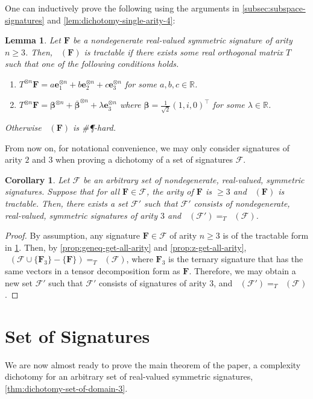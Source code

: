 \documentclass[11pt]{article}
\newtheorem{lemma}[theorem]{Lemma}
\newtheorem{corollary}[theorem]{Corollary}
\DeclareMathOperator{\holts}{Holant^*_3}
\newcommand{\sph}{\#\P-hard\xspace}
\newcommand{\transpose}{^\intercal}
\begin{document}
One can inductively prove the following using the arguments in \cref{subsec:subspace-signatures} and \cref{lem:dichotomy-single-arity-4}:
\begin{lemma}\label{lem:dichotomy-single-arity-n}
Let $\mathbf{F}$ be a nondegenerate real-valued symmetric signature of arity $n \ge 3$.
Then, $\holts(\mathbf{F})$ is tractable if there exists some real orthogonal matrix $T$ such that one of the following conditions holds.
\begin{enumerate}
  \item $T^{\otimes n} \mathbf{F} = a \mathbf{e}_1^{\otimes n} + b \mathbf{e}_2^{\otimes n} + c \mathbf{e}_3^{\otimes n}$ for some $a, b, c \in \mathbb{R}$.
  \item $T^{\otimes n}\mathbf{F} = \boldsymbol{\beta}^{\otimes n} + \overline{\boldsymbol{\beta}}^{\otimes n} + \lambda \mathbf{e}_3^{\otimes n}$ where $\mathbf{\beta} = \frac{1}{\sqrt{2}}(1, i, 0)\transpose$ for some $\lambda \in \mathbb{R}$.
\end{enumerate}
Otherwise $\holts(\mathbf{F})$ is \sph.
\end{lemma}
From now on, for notational convenience, we may only consider signatures of arity $2$ and $3$ when proving a dichotomy of a set of signatures $\mathcal{F}$. 
\begin{corollary}\label{cor:replace-arity-3}
    Let $\mathcal{F}$ be an arbitrary set of nondegenerate, real-valued, symmetric signatures.
    Suppose that for all $\mathbf{F} \in \mathcal{F}$, the arity of $\mathbf{F}$ is $\ge 3$ and $\holts(\mathbf{F})$ is tractable.
    Then, there exists a set $\mathcal{F}'$ such that $\mathcal{F}'$ consists of nondegenerate, real-valued, symmetric signatures of arity $3$ and 
    $\holts(\mathcal{F}') =_T \holts(\mathcal{F})$.
\end{corollary}
\begin{proof}
By assumption, any signature $\mathbf{F} \in \mathcal{F}$ of arity $n \ge 3$ is of the tractable form in \cref{lem:dichotomy-single-arity-n}.
Then, by \cref{prop:geneq-get-all-arity} and \cref{prop:z-get-all-arity}, 
$\holts(\mathcal{F} \cup \{\mathbf{F}_3\} - \{\mathbf{F}\}) =_T \holts(\mathcal{F})$, where $\mathbf{F}_3$ is the ternary signature that has the same vectors in a tensor decomposition form as $\mathbf{F}$.
Therefore, we may obtain a new set $\mathcal{F}'$ such that $\mathcal{F}'$ consists of signatures of arity $3$, and $\holts(\mathcal{F}') =_T \holts(\mathcal{F})$.
\end{proof} 
\section{Set of Signatures}\label{sec:set-of-signatures}
We are now almost ready to prove the main theorem of the paper, a complexity dichotomy 
for an arbitrary set of real-valued symmetric signatures, \cref{thm:dichotomy-set-of-domain-3}.
\end{document}
